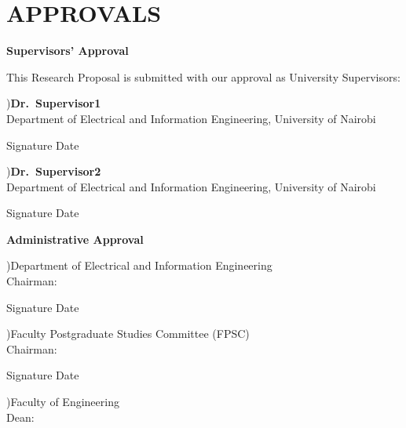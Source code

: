 \documentclass[12pt,a4paper]{report}
\newcommand{\sigline}[1][6cm]{\underline{\hspace{#1}}}
\begin{document}
\chapter*{APPROVALS}

\textbf{Supervisors' Approval}

This Research Proposal is submitted with our approval as University Supervisors:

\vspace{1.0cm}
)\quad\textbf{Dr.~Supervisor1}\\
\hspace*{1em}Department of Electrical and Information Engineering, University of Nairobi

\vspace{0.5cm}
\noindent
Signature \sigline[7cm]\quad Date \sigline[4cm]

\vspace{1.1cm}
)\quad\textbf{Dr.~Supervisor2}\\
\hspace*{1em}Department of Electrical and Information Engineering, University of Nairobi

\vspace{0.5cm}
\noindent
Signature \sigline[7cm]\quad Date \sigline[4cm]

\vspace{1.4cm}
\textbf{Administrative Approval}

\vspace{0.4cm}
)\quad Department of Electrical and Information Engineering\\
\hspace*{1em}Chairman:

\vspace{0.5cm}
\noindent
Signature \sigline[7cm]\quad Date \sigline[4cm]

\vspace{1.0cm}
)\quad Faculty Postgraduate Studies Committee (FPSC)\\
\hspace*{1em}Chairman:

\vspace{0.5cm}
\noindent
Signature \sigline[7cm]\quad Date \sigline[4cm]

\vspace{1.0cm}
)\quad Faculty of Engineering\\
\hspace*{1em}Dean:
\end{document}
